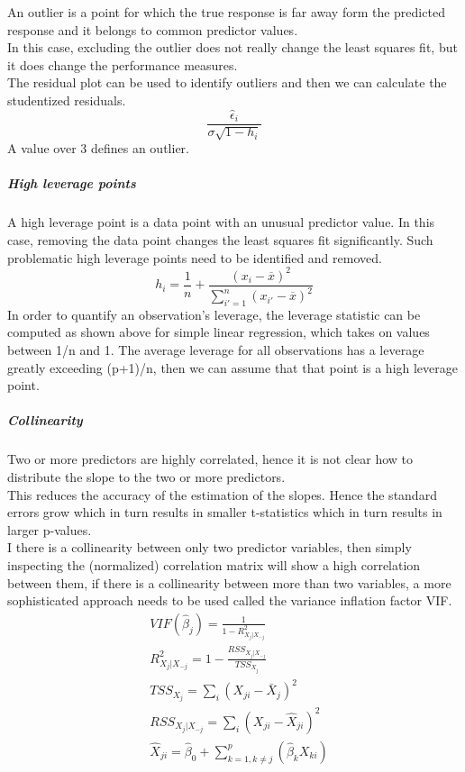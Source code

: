 \documentclass[../document.tex]{subfiles}
\begin{document}
	An outlier is a point for which the true response is far away form the predicted response and it belongs to common predictor values.\\
	In this case, excluding the outlier does not really change the least squares fit, but it does change the performance measures.\\
	The residual plot can be used to identify outliers and then we can calculate the studentized residuals.
	\begin{equation}
	\frac{\hat{\epsilon}_{i}}{\sigma\sqrt{1-h_{i}}}
	\end{equation}
	A value over 3 defines an outlier.
	\subparagraph{High leverage points}
	A high leverage point is a data point with an unusual predictor value. In this case, removing the data point changes the least squares fit significantly. Such problematic high leverage points need to be identified and removed. \\
	\begin{equation}
		h_{i} = \frac{1}{n}+\frac{(x_{i}-\overline{x})^2}{\sum_{i'=1}^{n}(x_{i'}-\overline{x})^2}
	\end{equation}
	In order to quantify an observation's leverage, the leverage statistic can be computed as shown above for simple linear regression, which takes on values between 1/n and 1. The average leverage for all observations has a leverage greatly exceeding (p+1)/n, then we can assume that that point is a high leverage point.
	\subparagraph{Collinearity}
	Two or more predictors are highly correlated, hence it is not clear how to distribute the slope to the two or more predictors. \\
	This reduces the accuracy of the estimation of the slopes. Hence the standard errors grow which in turn results in smaller t-statistics which in turn results in larger p-values.\\
	I there is a collinearity between only two predictor variables, then simply inspecting the (normalized) correlation matrix will show a high correlation between them, if there is a collinearity between more than two variables, a more sophisticated approach needs to be used called the variance inflation factor VIF.
	\begin{equation}
	\begin{split}
		&VIF(\hat{\beta}_{j}) = \frac{1}{1 - R^2_{X_{j}|X_{-j}}}\\
		&R^2_{X_{j}|X_{-j}} = 1 - \frac{RSS_{X_{j}|X_{-j}}}{TSS_{X_j}}\\
		&TSS_{X_j} = \sum_{i}(X_{ji} - \bar{X}_j)^2\\
		&RSS_{X_{j}|X_{-j}} = \sum_{i}(X_{ji} - \hat{X}_{ji})^2\\
		&\hat{X}_{ji} = \hat{\beta}_{0} + \sum_{k=1,k\ne j}^p{(\hat{\beta}_{k}X_{ki})}\\
	\end{split}
	\end{equation}
\end{document}
